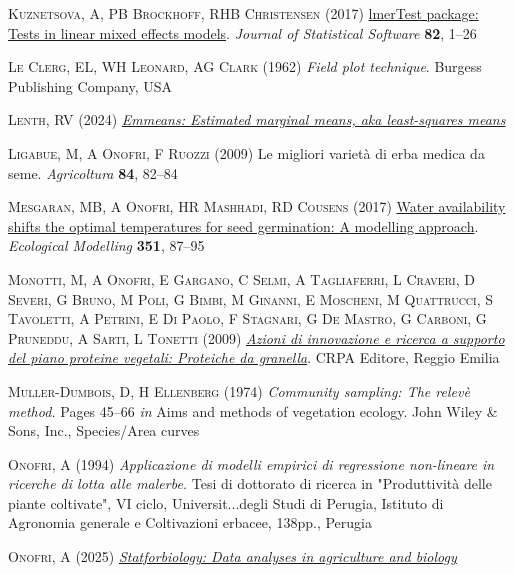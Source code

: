 \documentclass[
  letterpaper,
  DIV=11,
  numbers=noendperiod]{scrreprt}
\newlength{\cslhangindent}
\newenvironment{CSLReferences}[2] %
 {\begin{list}{}{%
  \setlength{\itemindent}{0pt}
  \setlength{\leftmargin}{0pt}
  \setlength{\parsep}{0pt}
  \ifodd #1
   \setlength{\leftmargin}{\cslhangindent}
   \setlength{\itemindent}{-1\cslhangindent}
  \fi
  \setlength{\itemsep}{#2\baselineskip}}}
 {\end{list}}
\begin{document}
\begin{CSLReferences}{1}{0}
\textsc{Kuznetsova, A, PB Brockhoff, RHB Christensen} (2017)
\href{https://doi.org/10.18637/jss.v082.i13}{{lmerTest} package: Tests
in linear mixed effects models}. \emph{Journal of Statistical Software}
\textbf{82}, 1--26

\textsc{Le Clerg, EL, WH Leonard, AG Clark} (1962) \emph{Field plot
technique}. Burgess Publishing Company, USA

\textsc{Lenth, RV} (2024)
\emph{\href{https://CRAN.R-project.org/package=emmeans}{Emmeans:
Estimated marginal means, aka least-squares means}}

\textsc{Ligabue, M, A Onofri, F Ruozzi} (2009) Le migliori variet{à} di
erba medica da seme. \emph{Agricoltura} \textbf{84}, 82--84

\textsc{Mesgaran, MB, A Onofri, HR Mashhadi, RD Cousens} (2017)
\href{https://doi.org/10.1016/j.ecolmodel.2017.02.020}{Water
availability shifts the optimal temperatures for seed germination: {A}
modelling approach}. \emph{Ecological Modelling} \textbf{351}, 87--95

\textsc{Monotti, M, A Onofri, E Gargano, C Selmi, A Tagliaferri, L
Craveri, D Severi, G Bruno, M Poli, G Bimbi, M Ginanni, E Moscheni, M
Quattrucci, S Tavoletti, A Petrini, E Di Paolo, F Stagnari, G De Mastro,
G Carboni, G Pruneddu, A Sarti, L Tonetti} (2009)
\emph{\href{http://www.crpa.it/nqcontent.cfm?a_id=7780&tt=crpa_www&sp=crpa}{Azioni
di innovazione e ricerca a supporto del piano proteine vegetali:
{Proteiche} da granella}}. CRPA Editore, Reggio Emilia

\textsc{Muller-Dumbois, D, H Ellenberg} (1974) \emph{Community sampling:
The relev{è} method.} Pages 45--66 \emph{in} Aims and methods of
vegetation ecology. John Wiley \& Sons, Inc., Species/Area curves

\textsc{Onofri, A} (1994) \emph{Applicazione di modelli empirici di
regressione non-lineare in ricerche di lotta alle malerbe.} Tesi di
dottorato di ricerca in "Produttivit{à} delle piante coltivate", VI
ciclo, Universit...degli Studi di Perugia, Istituto di Agronomia
generale e Coltivazioni erbacee, 138pp., Perugia

\textsc{Onofri, A} (2025)
\emph{\href{https://github.com/OnofriAndreaPG/statforbiology}{Statforbiology:
Data analyses in agriculture and biology}}


\end{CSLReferences}
\end{document}
